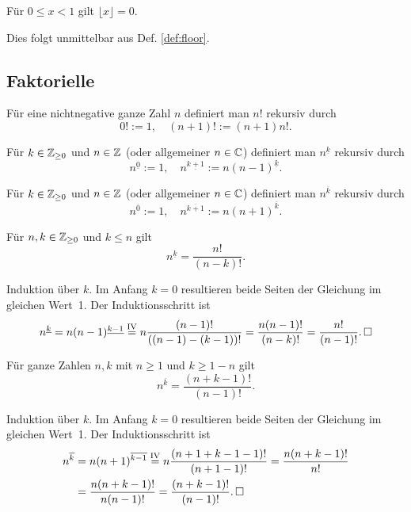 \begin{Satz}\label{floor-is-zero}
Für $0\le x < 1$ gilt $\lfloor x\rfloor = 0$.
\end{Satz}
\begin{Beweis}
Dies folgt unmittelbar aus Def. \ref{def:floor}.\,\qedsymbol
\end{Beweis}

\newpage
\subsection{Faktorielle}

\begin{Definition}[Fakultät]%
\label{def:factorial}\newlinefirst
Für eine nichtnegative ganze Zahl $n$ definiert man $n!$ rekursiv durch
\[0! := 1,\quad (n+1)! := (n+1)n!.\]
\end{Definition}

\begin{Definition}\label{def:falling-factorial}%
\newlinefirst
Für $k\in\mathbb Z_{\ge 0}$ und $n\in\mathbb Z$ (oder allgemeiner $n\in\mathbb C$)
definiert man $n^{\underline k}$ rekursiv durch
\[n^{\underline 0} := 1,\quad n^{\underline {k+1}}:=n(n-1)^{\underline k}.\]
\end{Definition}

\begin{Definition}\label{def:raising-factorial}%
\newlinefirst
Für $k\in\mathbb Z_{\ge 0}$ und $n\in\mathbb Z$ (oder allgemeiner $n\in\mathbb C$)
definiert man $n^{\overline k}$ rekursiv durch
\[n^{\overline 0} := 1,\quad n^{\overline {k+1}}:=n(n+1)^{\overline k}.\]
\end{Definition}

\begin{Satz}\label{relation-ff-factorial}
Für $n,k\in\mathbb Z_{\ge 0}$ und $k\le n$ gilt
\[n^{\underline k} = \frac{n!}{(n-k)!}.\]
\end{Satz}
\begin{Beweis}
Induktion über $k$. Im Anfang $k=0$ resultieren beide Seiten der
Gleichung im gleichen Wert~1. Der Induktionsschritt ist
\[n^{\underline k} = n(n-1)^{\underline{k-1}}
\stackrel{\text{IV}}= n\frac{(n-1)!}{((n-1)-(k-1))!}
= \frac{n(n-1)!}{(n-k)!}
= \frac{n!}{(n-1)!}.\,\square\]
\end{Beweis}

\begin{Satz}
Für ganze Zahlen $n,k$ mit $n\ge 1$ und $k\ge 1-n$ gilt
\[n^{\overline k} = \frac{(n+k-1)!}{(n-1)!}.\]
\end{Satz}
\begin{Beweis}
Induktion über $k$. Im Anfang $k=0$ resultieren beide Seiten der
Gleichung im gleichen Wert~1. Der Induktionsschritt ist
\begin{align*}
n^{\overline k} &= n(n+1)^{\overline{k-1}}
\stackrel{\text{IV}}= n\frac{(n+1+k-1-1)!}{(n+1-1)!}
= \frac{n(n+k-1)!}{n!}\\
&= \frac{n(n+k-1)!}{n(n-1)!}
= \frac{(n+k-1)!}{(n-1)!}.\,\square
\end{align*}
\end{Beweis}

